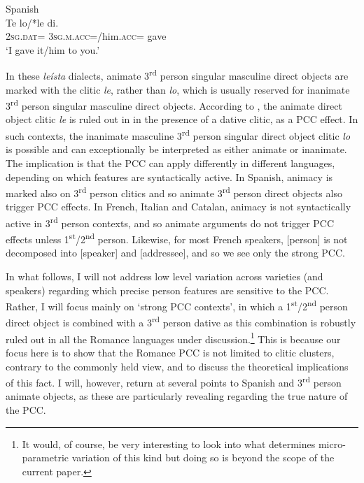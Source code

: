 \documentclass[output=paper,colorlinks,citecolor=brown,nonflat]{langsci/langscibook}
\begin{document}
\ea%
    \label{ex:sheehan:8}
    Spanish \citep[321]{OrmazabalRomero2007}\\
    \gll    Te     lo/*le     di.  \\
            \textsc{2sg}.\textsc{dat}=  \textsc{3sg.m.acc}=/him.\textsc{acc}=  gave\\
    \glt    ‘I gave it/him to you.’
\z

In these \textit{leísta} dialects, animate 3\textsuperscript{rd} person singular masculine direct objects are marked with the clitic \textit{le}, rather than \textit{lo}, which is usually reserved for inanimate 3\textsuperscript{rd} person singular masculine direct objects. According to \citeauthor{OrmazabalRomero2007}, the animate direct object clitic \textit{le} is ruled out in  in the presence of a dative clitic, as a PCC effect. In such contexts, the inanimate masculine 3\textsuperscript{rd} person singular direct object clitic \textit{lo} is possible and can exceptionally be interpreted as either animate or inanimate. The implication is that the PCC can apply differently in different languages, depending on which features are syntactically active. In Spanish, animacy is marked also on 3\textsuperscript{rd} person clitics and so animate 3\textsuperscript{rd} person direct objects also trigger PCC effects. In French, Italian and Catalan, animacy is not syntactically active in 3\textsuperscript{rd} person contexts, and so animate arguments do not trigger PCC effects unless 1\textsuperscript{st}/2\textsuperscript{nd} person. Likewise, for most French speakers, [person] is not decomposed into [speaker] and [addressee], and so we see only the strong PCC.

In what follows, I will not address low level variation across varieties (and speakers) regarding which precise person features are sensitive to the PCC. Rather, I will focus mainly on ‘strong PCC contexts’, in which a 1\textsuperscript{st}/2\textsuperscript{nd} person direct object is combined with a 3\textsuperscript{rd} person dative as this combination is robustly ruled out in all the Romance languages under discussion.\footnote{It would, of course, be very interesting to look into what determines micro-parametric variation of this kind but doing so is beyond the scope of the current paper.}  This is because our focus here is to show that the Romance PCC is not limited to clitic clusters, contrary to the commonly held view, and to discuss the theoretical implications of this fact. I will, however, return at several points to Spanish and 3\textsuperscript{rd} person animate objects, as these are particularly revealing regarding the true nature of the PCC.
\end{document}
